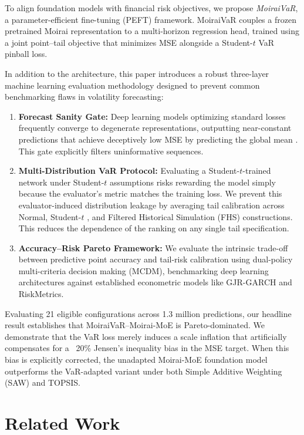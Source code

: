 \documentclass[runningheads]{llncs}
\begin{document}
To align foundation models with financial risk objectives, we propose \emph{MoiraiVaR}, a parameter-efficient fine-tuning (PEFT) framework. MoiraiVaR couples a frozen pretrained Moirai representation to a multi-horizon regression head, trained using a joint point--tail objective that minimizes MSE alongside a Student-\(t\) VaR pinball loss.

In addition to the architecture, this paper introduces a robust three-layer machine learning evaluation methodology designed to prevent common benchmarking flaws in volatility forecasting:
\begin{enumerate}
    \item \textbf{Forecast Sanity Gate:} Deep learning models optimizing standard losses frequently converge to degenerate representations, outputting near-constant predictions that achieve deceptively low MSE by predicting the global mean \cite{patton2011}. This gate explicitly filters uninformative sequences.
    \item \textbf{Multi-Distribution VaR Protocol:} Evaluating a Student-\(t\)-trained network under Student-\(t\) assumptions risks rewarding the model simply because the evaluator's metric matches the training loss. We prevent this evaluator-induced distribution leakage by averaging tail calibration across Normal, Student-\(t\) \cite{bollerslev1987}, and Filtered Historical Simulation (FHS) \cite{baroneadesi1999} constructions. This reduces the dependence of the ranking on any single tail specification.
    \item \textbf{Accuracy--Risk Pareto Framework:} We evaluate the intrinsic trade-off between predictive point accuracy and tail-risk calibration using dual-policy multi-criteria decision making (MCDM), benchmarking deep learning architectures against established econometric models like GJR-GARCH and RiskMetrics.
\end{enumerate}

Evaluating 21 eligible configurations across 1.3 million predictions, our headline result establishes that MoiraiVaR--Moirai-MoE is Pareto-dominated. We demonstrate that the VaR loss merely induces a scale inflation that artificially compensates for a ~20\% Jensen's inequality bias in the MSE target. When this bias is explicitly corrected, the unadapted Moirai-MoE foundation model outperforms the VaR-adapted variant under both Simple Additive Weighting (SAW) and TOPSIS.

\section{Related Work}
\end{document}

